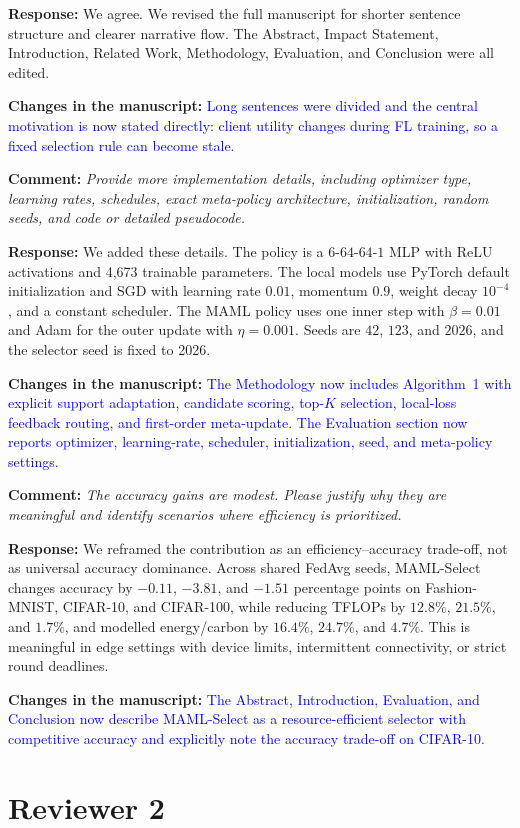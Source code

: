 \documentclass[11pt]{article}
\newcommand{\comment}[1]{\textbf{Comment:} \textit{#1}}
\newcommand{\response}[1]{\textbf{Response:} #1}
\newcommand{\change}[1]{\textbf{Changes in the manuscript:} \textcolor{blue}{#1}}
\begin{document}
\response{We agree. We revised the full manuscript for shorter sentence structure and clearer narrative flow. The Abstract, Impact Statement, Introduction, Related Work, Methodology, Evaluation, and Conclusion were all edited.}

\change{Long sentences were divided and the central motivation is now stated directly: client utility changes during FL training, so a fixed selection rule can become stale.}

\comment{Provide more implementation details, including optimizer type, learning rates, schedules, exact meta-policy architecture, initialization, random seeds, and code or detailed pseudocode.}

\response{We added these details. The policy is a $6$-$64$-$64$-$1$ MLP with ReLU activations and 4,673 trainable parameters. The local models use PyTorch default initialization and SGD with learning rate $0.01$, momentum $0.9$, weight decay $10^{-4}$, and a constant scheduler. The MAML policy uses one inner step with $\beta=0.01$ and Adam for the outer update with $\eta=0.001$. Seeds are $42$, $123$, and $2026$, and the selector seed is fixed to 2026.}

\change{The Methodology now includes Algorithm~1 with explicit support adaptation, candidate scoring, top-$K$ selection, local-loss feedback routing, and first-order meta-update. The Evaluation section now reports optimizer, learning-rate, scheduler, initialization, seed, and meta-policy settings.}

\comment{The accuracy gains are modest. Please justify why they are meaningful and identify scenarios where efficiency is prioritized.}

\response{We reframed the contribution as an efficiency--accuracy trade-off, not as universal accuracy dominance. Across shared FedAvg seeds, MAML-Select changes accuracy by $-0.11$, $-3.81$, and $-1.51$ percentage points on Fashion-MNIST, CIFAR-10, and CIFAR-100, while reducing TFLOPs by $12.8\%$, $21.5\%$, and $1.7\%$, and modelled energy/carbon by $16.4\%$, $24.7\%$, and $4.7\%$. This is meaningful in edge settings with device limits, intermittent connectivity, or strict round deadlines.}

\change{The Abstract, Introduction, Evaluation, and Conclusion now describe MAML-Select as a resource-efficient selector with competitive accuracy and explicitly note the accuracy trade-off on CIFAR-10.}

\section*{Reviewer 2}
\end{document}

